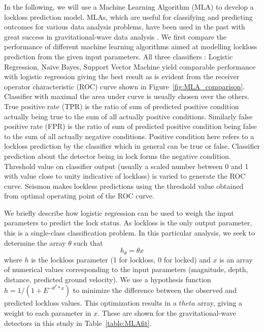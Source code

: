 \documentclass[reprint, prl, aps, showpacs]{revtex4-1}
\begin{document}
In the following, we will use a Machine Learning Algorithm (MLA) to develop a lockloss prediction model. MLAs, which are useful for classifying and predicting outcomes for various data analysis problems, have been used in the past with great success in gravitational-wave data analysis \cite{BiBl2013,KyHa2015}. We first compare the performance of different machine learning algorithms aimed at modelling lockloss prediction from the given input parameters.  All three classifiers : Logistic Regression\cite{mccullagh_glm}, Naive Bayes\cite{John_NaiveBayes}, Support Vector Machine\cite{Burges_SVM} yield comparable performance with logistic regression giving the best result as is evident from the  receiver operator characteristic (ROC) curve shown in Figure~\ref{fig:MLA_comparison}. Classifier with maximal the area under curve is usually chosen over  the others. True positive rate (TPR) is the ratio of sum of predicted positive condition actually being true to the sum of all actually positive conditions. Similarly false positive rate (FPR) is the ratio of sum of predicted positive condition being false to the sum of all actually negative conditions. Positive condition here refers to a lockloss prediction by the classifier which in general can be true or false. Classifier prediction about the detector being in lock  forms the negative condition. Threshold value on classifier output (usually a scaled number between 0 and 1 with value close to unity indicative of lockloss) is varied to generate the ROC curve. Seismon makes lockless predictions using the threshold value obtained from optimal operating point of the ROC curve. 	


We briefly describe how logistic regression can be used to weigh the input parameters to predict the lock status. As lockloss is the only output parameter, this is a single-class classification problem. In this particular analysis, we seek to determine the array $\theta$ such that \begin{equation}
h_{\theta} = \theta x
\label{eq:MLA}
\end{equation}
where $h$ is the lockloss parameter (1 for lockloss, 0 for locked) and $x$ is an array of numerical values corresponding to the input parameters (magnitude, depth, distance, predicted ground velocity). We use a hypothesis function $h=1/(1+E^{-\theta^{T}*x})$ to minimize the difference between the observed and predicted lockloss values. This optimization results in a $theta$ array, giving a weight to each parameter in $x$.
These are shown for the gravitational-wave detectors in this study in Table~\ref{table:MLAfit}. 
\end{document}
